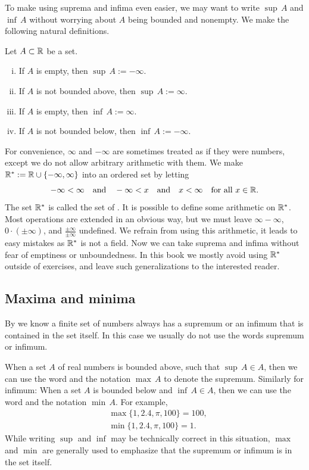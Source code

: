 To make using suprema and infima even easier, we may want to
write $\sup\, A$ and $\inf\, A$ without worrying about $A$ being
bounded and nonempty.  We make the following natural definitions.

\begin{defn}
Let $A \subset {\mathbb{R}}$ be a set.
\begin{enumerate}[(i)]
\item If $A$ is empty, then $\sup\, A := -\infty$.
\item If $A$ is not bounded above, then $\sup\, A := \infty$.
\item If $A$ is empty, then $\inf\, A := \infty$.
\item If $A$ is not bounded below, then $\inf\, A := -\infty$.
\end{enumerate}
\end{defn}

For convenience,  $\infty$ and $-\infty$ are sometimes treated as if they were
numbers, except we do not allow arbitrary arithmetic with them.
We make ${\mathbb{R}}^* := {\mathbb{R}} \cup \{ -\infty , \infty\}$
into an ordered set
by letting
\begin{equation*}
-\infty < \infty \quad \text{and} \quad
-\infty < x \quad \text{and} \quad
x < \infty \quad \text{for all $x \in {\mathbb{R}}$}.
\end{equation*}
The set ${\mathbb{R}}^*$ is called the set of \emph{}.
It is possible to define some arithmetic on ${\mathbb{R}}^*$.  Most operations
are extended in an obvious way, but we must leave
$\infty-\infty$, $0 \cdot (\pm\infty)$, and $\frac{\pm\infty}{\pm\infty}$
undefined.
We refrain from
using this arithmetic,
it leads to easy mistakes as ${\mathbb{R}}^*$ is not a field.
Now we can take suprema and infima without fear of emptiness or
unboundedness.  In this book we mostly avoid
using ${\mathbb{R}}^*$ outside of exercises, and leave such generalizations to the interested reader.

\subsection{Maxima and minima}

By  we know 
a finite set of numbers always has a supremum or an infimum that is contained
in the set itself.  In this case we usually do not use the words
supremum or infimum.

When a set $A$ of real numbers is bounded above,
such that 
$\sup\, A \in A$, then we can use the word
\emph{} and the notation $\max\, A$ to denote the supremum.
Similarly for infimum: When a set $A$ is bounded below
and $\inf\, A \in A$, then we can use the
word \emph{} and the notation $\min\, A$.
For example,
\begin{align*}
& \max \{ 1,2.4,\pi,100 \} = 100 , \\
& \min \{ 1,2.4,\pi,100 \} = 1 .
\end{align*}
While writing $\sup$ and $\inf$ may be technically
correct in this situation, $\max$ and
$\min$ are generally used to emphasize that the supremum or infimum
is in the set itself.

